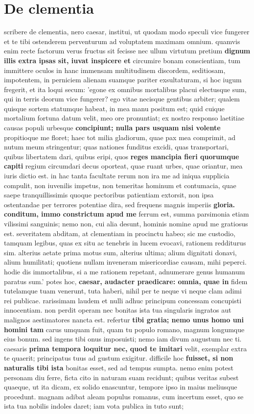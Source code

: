 \section{De clementia}
scribere de clementia, nero caesar, institui, ut quodam modo speculi vice fungerer et te tibi ostenderem perventurum ad voluptatem maximam omnium. quamvis enim recte factorum verus fructus sit fecisse nec ullum virtutum pretium \textbf{dignum illis extra ipsas sit, iuvat inspicere et} circumire bonam conscientiam, tum immittere oculos in hanc immensam multitudinem discordem, seditiosam, impotentem, in perniciem alienam suamque pariter exsultaturam, si hoc iugum fregerit, et ita loqui secum: 'egone ex omnibus mortalibus placui electusque sum, qui in terris deorum vice fungerer? ego vitae necisque gentibus arbiter; qualem quisque sortem statumque habeat, in mea manu positum est; quid cuique mortalium fortuna datum velit, meo ore pronuntiat; ex nostro responso laetitiae causas populi urbesque \textbf{concipiunt; nulla pars usquam nisi volente} propitioque me floret; haec tot milia gladiorum, quae pax mea comprimit, ad nutum meum stringentur; quas nationes funditus excidi, quas transportari, quibus libertatem dari, quibus eripi, quos \textbf{reges mancipia fieri quorumque capiti} regium circumdari decus oporteat, quae ruant urbes, quae oriantur, mea iuris dictio est. in hac tanta facultate rerum non ira me ad iniqua supplicia compulit, non iuvenilis impetus, non temeritas hominum et contumacia, quae saepe tranquillissimis quoque pectoribus patientiam extorsit, non ipsa ostentandae per terrores potentiae dira, sed frequens magnis imperiis \textbf{gloria. conditum, immo constrictum apud me} ferrum est, summa parsimonia etiam vilissimi sanguinis; nemo non, cui alia desunt, hominis nomine apud me gratiosus est. severitatem abditam, at clementiam in procinctu habeo; sic me custodio, tamquam legibus, quas ex situ ac tenebris in lucem evocavi, rationem redditurus sim. alterius aetate prima motus sum, alterius ultima; alium dignitati donavi, alium humilitati; quotiens nullam inveneram misericordiae causam, mihi peperci. hodie dis immortalibus, si a me rationem repetant, adnumerare genus humanum paratus sum.' potes hoc, \textbf{caesar, audacter praedicare: omnia, quae in} fidem tutelamque tuam venerunt, tuta haberi, nihil per te neque vi neque clam adimi rei publicae. rarissimam laudem et nulli adhuc principum concessam concupisti innocentiam. non perdit operam nec bonitas ista tua singularis ingratos aut malignos aestimatores nancta est. refertur \textbf{tibi gratia; nemo unus homo uni homini tam} carus umquam fuit, quam tu populo romano, magnum longumque eius bonum. sed ingens tibi onus imposuisti; nemo iam divum augustum nec ti. caesaris \textbf{prima tempora loquitur nec, quod te imitari} velit, exemplar extra te quaerit; principatus tuus ad gustum exigitur. difficile hoc \textbf{fuisset, si non naturalis tibi ista} bonitas esset, sed ad tempus sumpta. nemo enim potest personam diu ferre, ficta cito in naturam suam recidunt; quibus veritas subest quaeque, ut ita dicam, ex solido enascuntur, tempore ipso in maius meliusque procedunt. magnam adibat aleam populus romanus, cum incertum esset, quo se ista tua nobilis indoles daret; iam vota publica in tuto sunt; 